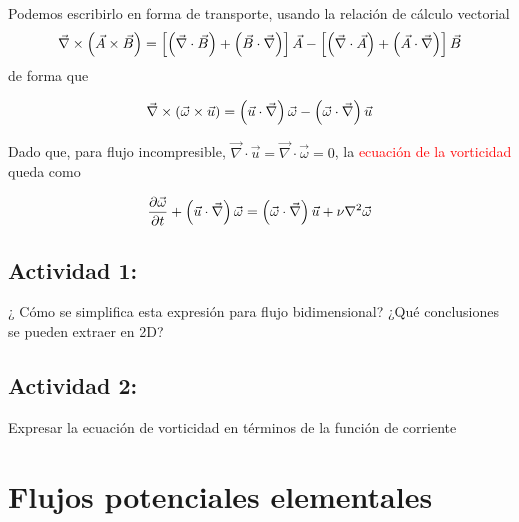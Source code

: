 	Podemos escribirlo en forma de transporte, usando la relación de cálculo
	vectorial 
	\[
	\vec \nabla \times\left(\vec{A}\times\vec{B}\right)=\left[\left(\vec{\nabla}\cdot\vec{B}\right)+\left(\vec{B}\cdot\vec{\nabla}\right)\right]\vec{A}-\left[\left(\vec{\nabla}\cdot\vec{A}\right)+\left(\vec{A}\cdot\vec{\nabla}\right)\right]\vec{B}
	\]
	de forma que 
	
\begin{equation}
		\vec \nabla \times\left(\vec{\omega}\times\vec{u}\right)=\left(\vec{u}\cdot\vec{\nabla}\right)\vec{\omega}-\left(\vec{\omega}\cdot\vec{\nabla}\right)\vec{u}
\end{equation}
	
	
	Dado que, para flujo incompresible, $\vec{\nabla}\cdot\vec{u}=\vec{\nabla}\cdot\vec{\omega}=0$,
	la \textcolor{red}{ecuación de la vorticidad} queda como 
	
\begin{equation}
		\frac{\partial \vec{\omega}}{\partial t}+\left(\vec{u}\cdot\vec{\nabla}\right)\vec{\omega}=\left(\vec{\omega}\cdot\vec{\nabla}\right)\vec{u}+\nu\nabla^{2}\vec{\omega}
\end{equation}
	
	
	\subsection*{Actividad 1:}
		¿ Cómo se simplifica esta expresión para flujo bidimensional? ¿Qué
		conclusiones se pueden extraer en 2D?

	\subsection*{Actividad 2:}
		Expresar la ecuación de vorticidad en términos de la función de corriente


\section{Flujos potenciales elementales}
	
